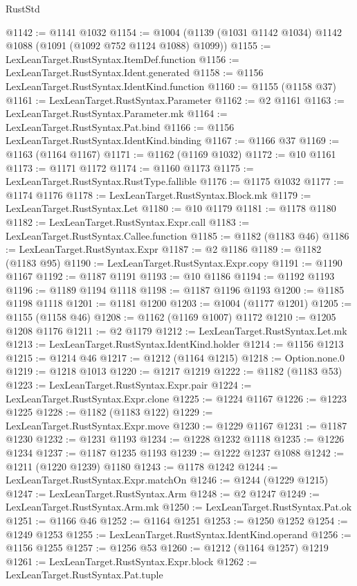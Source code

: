 \begin{lexlean}{RustStd}
\begin{coremodule}
{\begin{coremodule}
{{{{{{{{{{{{{{{{{{{{{{{{{{{{{{{{@1142 := @1141 @1032
@1154 := @1004 (@1139 (@1031 @1142 @1034) @1142 @1088 (@1091 (@1092 @752 @1124 @1088) @1099))
@1155 := LexLeanTarget.RustSyntax.ItemDef.function
@1156 := LexLeanTarget.RustSyntax.Ident.generated
@1158 := @1156 LexLeanTarget.RustSyntax.IdentKind.function
@1160 := @1155 (@1158 @37)
@1161 := LexLeanTarget.RustSyntax.Parameter
@1162 := @2 @1161
@1163 := LexLeanTarget.RustSyntax.Parameter.mk
@1164 := LexLeanTarget.RustSyntax.Pat.bind
@1166 := @1156 LexLeanTarget.RustSyntax.IdentKind.binding
@1167 := @1166 @37
@1169 := @1163 (@1164 @1167)
@1171 := @1162 (@1169 @1032)
@1172 := @10 @1161
@1173 := @1171 @1172
@1174 := @1160 @1173
@1175 := LexLeanTarget.RustSyntax.RustType.fallible
@1176 := @1175 @1032
@1177 := @1174 @1176
@1178 := LexLeanTarget.RustSyntax.Block.mk
@1179 := LexLeanTarget.RustSyntax.Let
@1180 := @10 @1179
@1181 := @1178 @1180
@1182 := LexLeanTarget.RustSyntax.Expr.call
@1183 := LexLeanTarget.RustSyntax.Callee.function
@1185 := @1182 (@1183 @46)
@1186 := LexLeanTarget.RustSyntax.Expr
@1187 := @2 @1186
@1189 := @1182 (@1183 @95)
@1190 := LexLeanTarget.RustSyntax.Expr.copy
@1191 := @1190 @1167
@1192 := @1187 @1191
@1193 := @10 @1186
@1194 := @1192 @1193
@1196 := @1189 @1194 @1118
@1198 := @1187 @1196 @1193
@1200 := @1185 @1198 @1118
@1201 := @1181 @1200
@1203 := @1004 (@1177 @1201)
@1205 := @1155 (@1158 @46)
@1208 := @1162 (@1169 @1007) @1172
@1210 := @1205 @1208 @1176
@1211 := @2 @1179
@1212 := LexLeanTarget.RustSyntax.Let.mk
@1213 := LexLeanTarget.RustSyntax.IdentKind.holder
@1214 := @1156 @1213
@1215 := @1214 @46
@1217 := @1212 (@1164 @1215)
@1218 := Option.none.{0}
@1219 := @1218 @1013
@1220 := @1217 @1219
@1222 := @1182 (@1183 @53)
@1223 := LexLeanTarget.RustSyntax.Expr.pair
@1224 := LexLeanTarget.RustSyntax.Expr.clone
@1225 := @1224 @1167
@1226 := @1223 @1225
@1228 := @1182 (@1183 @122)
@1229 := LexLeanTarget.RustSyntax.Expr.move
@1230 := @1229 @1167
@1231 := @1187 @1230
@1232 := @1231 @1193
@1234 := @1228 @1232 @1118
@1235 := @1226 @1234
@1237 := @1187 @1235 @1193
@1239 := @1222 @1237 @1088
@1242 := @1211 (@1220 @1239) @1180
@1243 := @1178 @1242
@1244 := LexLeanTarget.RustSyntax.Expr.matchOn
@1246 := @1244 (@1229 @1215)
@1247 := LexLeanTarget.RustSyntax.Arm
@1248 := @2 @1247
@1249 := LexLeanTarget.RustSyntax.Arm.mk
@1250 := LexLeanTarget.RustSyntax.Pat.ok
@1251 := @1166 @46
@1252 := @1164 @1251
@1253 := @1250 @1252
@1254 := @1249 @1253
@1255 := LexLeanTarget.RustSyntax.IdentKind.operand
@1256 := @1156 @1255
@1257 := @1256 @53
@1260 := @1212 (@1164 @1257) @1219
@1261 := LexLeanTarget.RustSyntax.Expr.block
@1262 := LexLeanTarget.RustSyntax.Pat.tuple
}}}}}}}}}}}}}}}}}}}}}}}}}}}}}}}}
\end{coremodule}}
\end{coremodule}
\end{lexlean}
